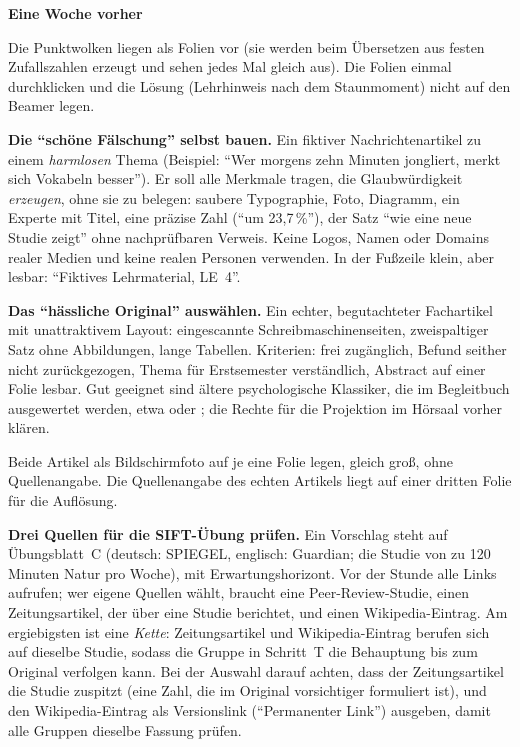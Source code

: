 \begin{vorbereitung}
\textbf{Eine Woche vorher}
\begin{checkliste}
  \item Die Punktwolken liegen als Folien vor (sie werden beim Übersetzen
    aus festen Zufallszahlen erzeugt und sehen jedes Mal gleich aus). Die
    Folien einmal durchklicken und die Lösung (Lehrhinweis nach dem
    Staunmoment) nicht auf den Beamer legen.
  \item \textbf{Die \enquote{schöne Fälschung} selbst bauen.} Ein fiktiver
    Nachrichtenartikel zu einem \emph{harmlosen} Thema (Beispiel: \enquote{Wer
    morgens zehn Minuten jongliert, merkt sich Vokabeln besser}). Er
    soll alle Merkmale tragen, die Glaubwürdigkeit \emph{erzeugen}, ohne sie
    zu belegen: saubere Typographie, Foto, Diagramm, ein Experte mit Titel,
    eine präzise Zahl (\enquote{um 23,7\,\%}), der Satz \enquote{wie eine neue
    Studie zeigt} ohne nachprüfbaren Verweis. Keine Logos, Namen oder
    Domains realer Medien und keine realen Personen verwenden. In der
    Fußzeile klein, aber lesbar: \enquote{Fiktives Lehrmaterial, LE~4}.
  \item \textbf{Das \enquote{hässliche Original} auswählen.} Ein echter,
    begutachteter Fachartikel mit unattraktivem Layout: eingescannte
    Schreibmaschinenseiten, zweispaltiger Satz ohne Abbildungen, lange
    Tabellen. Kriterien: frei zugänglich, Befund seither nicht
    zurückgezogen, Thema für Erstsemester verständlich, Abstract auf einer
    Folie lesbar. Gut geeignet sind ältere psychologische Klassiker, die im
    Begleitbuch ausgewertet werden, etwa \textcite{forer1949fallacy} oder
    \textcite{wason1960failure}; die Rechte für die Projektion im Hörsaal
    vorher klären.
  \item Beide Artikel als Bildschirmfoto auf je eine Folie legen, gleich
    groß, ohne Quellenangabe. Die Quellenangabe des echten Artikels liegt
    auf einer dritten Folie für die Auflösung.
  \item \textbf{Drei Quellen für die SIFT-Übung prüfen.} Ein Vorschlag
    steht auf Übungsblatt~C (deutsch: SPIEGEL, englisch: Guardian; die Studie
    von \textcite{white2019nature} zu 120 Minuten Natur pro Woche), mit
    Erwartungshorizont. Vor der Stunde alle Links aufrufen; wer eigene
    Quellen wählt, braucht eine Peer-Review-Studie, einen Zeitungsartikel,
    der über eine Studie berichtet, und einen Wikipedia-Eintrag. Am
    ergiebigsten ist eine \emph{Kette}: Zeitungsartikel und
    Wikipedia-Eintrag berufen sich auf dieselbe Studie, sodass die Gruppe
    in Schritt~T die Behauptung bis zum Original verfolgen kann. Bei der
    Auswahl darauf achten, dass der Zeitungsartikel die Studie zuspitzt
    (eine Zahl, die im Original vorsichtiger formuliert ist), und den
    Wikipedia-Eintrag als Versionslink (\enquote{Permanenter Link})
    ausgeben, damit alle Gruppen dieselbe Fassung prüfen.
\end{checkliste}


\end{vorbereitung}
